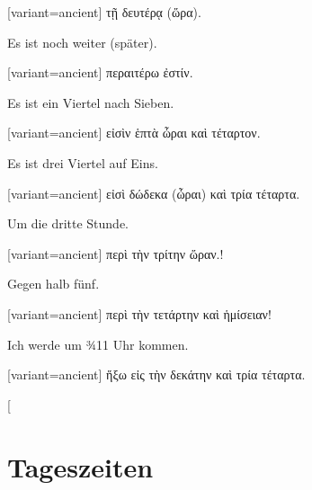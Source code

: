 \begin{greek}[variant=ancient]%
τῇ δευτέρᾳ (ὥρα).

\end{greek}%
\switchcolumn*

Es ist noch weiter (später).

\switchcolumn

\begin{greek}[variant=ancient]%
περαιτέρω ἐστίν.

\end{greek}%
\switchcolumn*

Es ist ein Viertel nach Sieben.

\switchcolumn

\begin{greek}[variant=ancient]%
εἰσὶν ἑπτὰ ὦραι καὶ τέταρτον.

\end{greek}%
\switchcolumn*

Es ist drei Viertel auf Eins.

\switchcolumn

\begin{greek}[variant=ancient]%
εἰσὶ δώδεκα (ὦραι) καὶ τρία τέταρτα.

\end{greek}%
\switchcolumn*

Um die dritte Stunde.

\switchcolumn

\begin{greek}[variant=ancient]%
περὶ τὴν τρίτην ὥραν.!

\end{greek}%
\switchcolumn*

Gegen halb fünf.

\switchcolumn

\begin{greek}[variant=ancient]%
περὶ τὴν τετάρτην καὶ ἡμίσειαν!

\end{greek}%
\switchcolumn*

Ich werde um ¾11 Uhr kommen.

\switchcolumn

\begin{greek}[variant=ancient]%
ἥξω εἰς τὴν δεκάτην καὶ τρία τέταρτα.

\end{greek}%
\switchcolumn*[


\section{Tages\textcompwordmark{}zeiten}


